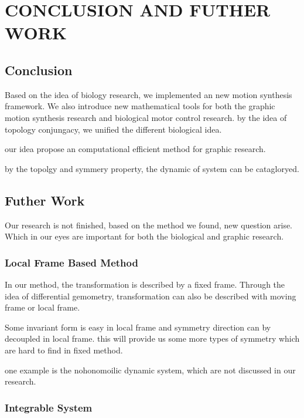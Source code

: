 \def\baselinestretch{1}
\chapter{CONCLUSION AND FUTHER WORK}
\label{chap:Conclusiont}
\ifpdf
    \graphicspath{{Conclusions/ConclusionsFigs/PNG/}{Conclusions/ConclusionsFigs/PDF/}{Conclusions/ConclusionsFigs/}}
\else
    \graphicspath{{Conclusions/ConclusionsFigs/EPS/}{Conclusions/ConclusionsFigs/}}
\fi

\def\baselinestretch{1.66}

\section{Conclusion}

Based on the idea of biology research, we implemented an new motion synthesis framework.
We also introduce new mathematical tools for both the graphic motion synthesis research and biological motor control research.
by the idea of topology conjungacy, we unified the different biological idea.

our idea propose an computational efficient method for graphic research.

by the topolgy and symmery property,
the dynamic of system can be catagloryed.




\section{Futher Work}
Our research is not finished, based on the method we found, new question arise.
Which in our eyes are important for both the biological and graphic research.
\subsection{Local Frame Based Method}
In our method, the transformation is described by a fixed frame.
Through the idea of differential gemometry, transformation can also be described with moving frame or local frame.

Some invariant form is easy in local frame and symmetry direction can by decoupled in local frame.
this will provide us  some more types of symmetry which are hard to find in fixed method.

one example is the nohonomoilic dynamic system, which are not discussed in our research.


\subsection{Integrable System}

